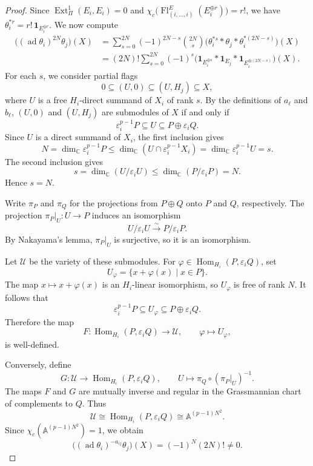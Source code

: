 \documentclass[12pt,reqno]{amsart}
\numberwithin{equation}{section}
\theoremstyle{definition}
\theoremstyle{remark}
\newcommand{\C}{\mathbb C}
\newcommand{\ad}{\operatorname{ad}}
\newcommand{\Hom}{\operatorname{Hom}}
\newcommand{\Ext}{\operatorname{Ext}}
\newcommand{\Fl}{\operatorname{Fl}}
\theoremstyle{plain}
\theoremstyle{plain}
\begin{document}
\begin{proof}
Since $\Ext^1_\Pi(E_i,E_i)=0$ and $\chi_c\bigl(\Fl^E_{(i,\ldots,i)}(E_i^{\oplus r})\bigr)=r!$, we have $\theta_i^{*r}=r!\,\mathbf1_{E_i^{\oplus r}}$. We now compute
\begin{align*}
    \bigl((\ad\theta_i)^{2N}\theta_j\bigr)(X)
    &=
    \sum_{s=0}^{2N}(-1)^{2N-s}\binom{2N}{s}
    \bigl(\theta_i^{*s}*\theta_j*
          \theta_i^{*(2N-s)}\bigr)(X)\\
    &=
    (2N)!\sum_{s=0}^{2N}(-1)^s
    \bigl(
        \mathbf1_{E_i^{\oplus s}}
        *\mathbf1_{E_j}
        *\mathbf1_{E_i^{\oplus(2N-s)}}
    \bigr)(X).
\end{align*}
For each $s$, we consider partial flags
\[
    0\subseteq(U,0)\subseteq(U,H_j)\subseteq X,
\]
where $U$ is a free $H_i$-direct summand of $X_i$ of rank $s$. By the definitions of $a_\ell$ and $b_\ell$, $(U,0)$ and $(U,H_j)$ are submodules of $X$ if and only if
\[
    \varepsilon_i^{p-1}P
        \subseteq U\subseteq P\oplus\varepsilon_iQ.
\]
Since $U$ is a direct summand of $X_i$, the first inclusion gives
\[
    N=\dim_\C\varepsilon_i^{p-1}P
      \le\dim_\C(U \cap \varepsilon_i^{p-1}X_i)
      =\dim_\C\varepsilon_i^{p-1}U=s.
\]
The second inclusion gives
\[
    s=\dim_\C(U/\varepsilon_iU)\le \dim_\C(P/\varepsilon_iP)=N.
\]
Hence $s=N$. 

Write $\pi_P$ and $\pi_Q$ for the projections from $P\oplus Q$ onto $P$ and $Q$, respectively. The projection $\pi_P|_U:U\to P$ induces an isomorphism
\[
    U/\varepsilon_iU \xrightarrow{\sim} P/\varepsilon_iP.
\]
By Nakayama's lemma, $\pi_P|_U$ is surjective, so it is an isomorphism.

Let $\mathcal U$ be the variety of these submodules. For $\varphi\in\Hom_{H_i}(P,\varepsilon_iQ)$, set
\[
    U_\varphi=\{x+\varphi(x)\mid x\in P\}.
\]
The map $x\mapsto x+\varphi(x)$ is an $H_i$-linear isomorphism, so $U_\varphi$ is free of rank $N$. It follows that
\[
    \varepsilon_i^{p-1}P \subseteq U_\varphi \subseteq P\oplus\varepsilon_iQ.
\]
Therefore the map
\[
    F:\Hom_{H_i}(P,\varepsilon_iQ)
    \longrightarrow\mathcal U,
    \qquad \varphi\longmapsto U_\varphi,
\]
is well-defined.

Conversely, define
\[
    G: \mathcal U
    \longrightarrow \Hom_{H_i}(P,\varepsilon_iQ),
    \qquad U\longmapsto\pi_Q\circ(\pi_P|_U)^{-1}.
\]
The maps $F$ and $G$ are mutually inverse and regular in the Grassmannian chart of complements to $Q$. Thus
\[
    \mathcal U\cong\Hom_{H_i}(P,\varepsilon_iQ)
        \cong\mathbb A^{(p-1)N^2}.
\]
Since $\chi_c(\mathbb A^{(p-1)N^2})=1$, we obtain
\[
    \bigl((\ad\theta_i)^{-a_{ij}}\theta_j\bigr)(X)
      =(-1)^N(2N)!\ne0.
\]
\end{proof}
\end{document}
